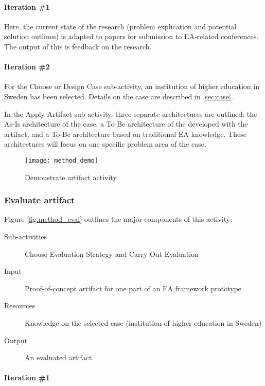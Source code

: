 \paragraph{Iteration \#1}

Here, the current state of the research (problem explication and potential solution outlines) is adapted to papers for submission to EA-related conferences. The output of this is feedback on the research.

\paragraph{Iteration \#2}
For the Choose or Design Case sub-activity, an institution of higher education in Sweden has been selected. Details on the case are described in \ref{sec:case}.

In the Apply Artifact sub-activity, three separate architectures are outlined: the As-Is architecture of the case, a To-Be architecture of the developed with the artifact, and a To-Be architecture based on traditional EA knowledge. These architectures will focus on one specific problem area of the case.

\begin{figure}
\texttt{[image: method\_demo]}
\caption{Demonstrate artifact activity}
\label{fig:method_demo}
\end{figure}

\subsubsection*{Evaluate artifact}

Figure \ref{fig:method_eval} outlines the major components of this activity:
\begin{description}
  \item[Sub-activities] Choose Evaluation Strategy and Carry Out Evaluation~\cite[Ch. 8]{johannessonPerjons2012}
  \item[Input] Proof-of-concept artifact for one part of an EA framework prototype
  \item[Resources]  Knowledge on the selected case (institution of higher education in Sweden)
  \item[Output] An evaluated artifact
\end{description}

\paragraph{Iteration \#1}

